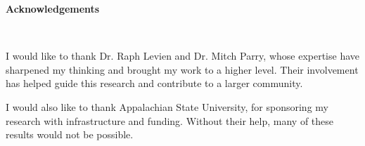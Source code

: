 \vspace*{0.5in}
\begin{center}
    \textbf{Acknowledgements}\\[2ex]
\end{center}

\begin{doublespace}
I would like to thank Dr. Raph Levien and Dr. Mitch Parry, whose expertise have sharpened my thinking and brought my work to a higher level. Their involvement has helped guide this research and contribute to a larger community.

\bigskip
I would also like to thank Appalachian State University, for sponsoring my research with infrastructure and funding. Without their help, many of these results would not be possible.
\end{doublespace}